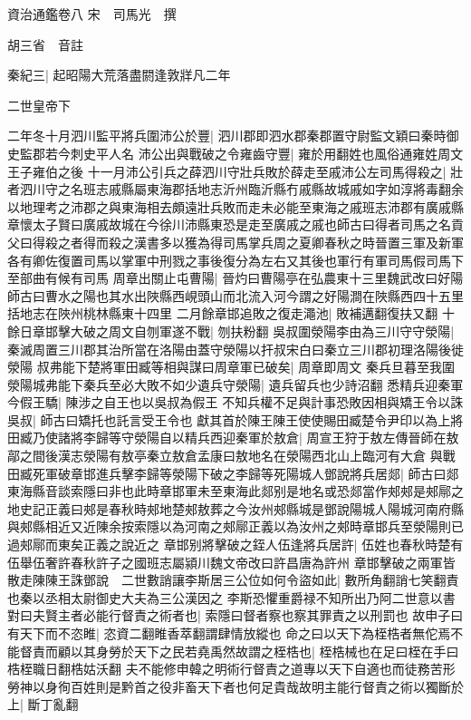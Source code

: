 資治通鑑卷八
宋　司馬光　撰

胡三省　音註

秦紀三|{
	起昭陽大荒落盡閼逢敦牂凡二年}


二世皇帝下

二年冬十月泗川監平將兵圍沛公於豐|{
	泗川郡即泗水郡秦郡置守尉監文穎曰秦時御史監郡若今刺史平人名}
沛公出與戰破之令雍齒守豐|{
	雍於用翻姓也風俗通雍姓周文王子雍伯之後}
十一月沛公引兵之薛泗川守壯兵敗於薛走至戚沛公左司馬得殺之|{
	壯者泗川守之名班志戚縣屬東海郡括地志沂州臨沂縣冇戚縣故城戚如字如淳將毒翻余以地理考之沛郡之與東海相去頗遠壯兵敗而走未必能至東海之戚班志沛郡有廣戚縣章懷太子賢曰廣戚故城在今徐川沛縣東恐是走至廣戚之戚也師古曰得者司馬之名貢父曰得殺之者得而殺之漢書多以獲為得司馬掌兵周之夏卿春秋之時晉置三軍及新軍各有卿佐復置司馬以掌軍中刑戮之事後復分為左右又其後也軍行有軍司馬假司馬下至部曲有候有司馬}
周章出關止屯曹陽|{
	晉灼曰曹陽亭在弘農東十三里魏武改曰好陽師古曰曹水之陽也其水出陜縣西峴頭山而北流入河今謂之好陽澗在陜縣西四十五里括地志在陜州桃林縣東十四里}
二月餘章邯追敗之復走澠池|{
	敗補邁翻復扶又翻}
十餘日章邯擊大破之周文自刎軍遂不戰|{
	刎扶粉翻}
吳叔圍滎陽李由為三川守守滎陽|{
	秦滅周置三川郡其治所當在洛陽由蓋守滎陽以扞叔宋白曰秦立三川郡初理洛陽後徙滎陽}
叔弗能下楚將軍田臧等相與謀曰周章軍已破矣|{
	周章即周文}
秦兵旦暮至我圍滎陽城弗能下秦兵至必大敗不如少遺兵守滎陽|{
	遺兵留兵也少詩沼翻}
悉精兵迎秦軍今假王驕|{
	陳涉之自王也以吳叔為假王}
不知兵權不足與計事恐敗因相與矯王令以誅吳叔|{
	師古曰矯托也託言受王令也}
獻其首於陳王陳王使使賜田臧楚令尹印以為上將田臧乃使諸將李歸等守滎陽自以精兵西迎秦軍於敖倉|{
	周宣王狩于敖左傳晉師在敖鄗之間後漢志滎陽有敖亭秦立敖倉孟康曰敖地名在滎陽西北山上臨河有大倉}
與戰田臧死軍破章邯進兵擊李歸等滎陽下破之李歸等死陽城人鄧說將兵居郯|{
	師古曰郯東海縣音談索隱曰非也此時章邯軍未至東海此郯别是地名或恐郯當作郟郟是郟鄏之地史記正義曰郟是春秋時郟地楚郟敖葬之今汝州郟縣城是鄧說陽城人陽城河南府縣與郟縣相近又近陳余按索隱以為河南之郟鄏正義以為汝州之郟時章邯兵至滎陽則已過郟鄏而東矣正義之說近之}
章邯别將擊破之銍人伍逢將兵居許|{
	伍姓也春秋時楚有伍舉伍奢許春秋許子之國班志屬潁川魏文帝改曰許昌唐為許州}
章邯擊破之兩軍皆散走陳陳王誅鄧說　二世數誚讓李斯居三公位如何令盜如此|{
	數所角翻誚七笑翻責也秦以丞相太尉御史大夫為三公漢因之}
李斯恐懼重爵禄不知所出乃阿二世意以書對曰夫賢主者必能行督責之術者也|{
	索隱曰督者察也察其罪責之以刑罰也}
故申子曰有天下而不恣睢|{
	恣資二翻睢香萃翻謂肆情放縱也}
命之曰以天下為桎梏者無佗焉不能督責而顧以其身勞於天下之民若堯禹然故謂之桎梏也|{
	桎梏械也在足曰桎在手曰梏桎職日翻梏姑沃翻}
夫不能修申韓之明術行督責之道專以天下自適也而徒務苦形勞神以身徇百姓則是黔首之役非畜天下者也何足貴哉故明主能行督責之術以獨斷於上|{
	斷丁亂翻}
